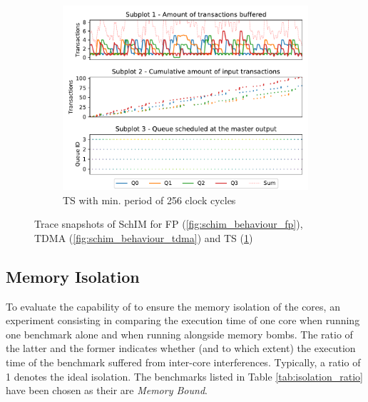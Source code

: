 \begin{figure}[]
\begin{subfigure}{0.5\textwidth}
      \end{subfigure}
      \vfill
      \begin{subfigure}{0.5\textwidth}
        \centering
        \includegraphics[scale=0.55]{images/SchIM_MG_buffering.pdf}
        \caption{TS with min. period of 256 clock cycles}
        \label{fig:schim_behaviour_mg}
      \end{subfigure}
      \caption{Trace snapshots of SchIM for FP (\ref{fig:schim_behaviour_fp}), TDMA (\ref{fig:schim_behaviour_tdma}) and TS (\ref{fig:schim_behaviour_mg})}
      \label{fig:schim_behaviour}
    \end{figure}

  \subsection{Memory Isolation}
    To evaluate the capability of \schim to ensure the memory isolation of the cores, an experiment consisting in comparing the execution time of one core when running one benchmark alone and when running alongside memory bombs. The ratio of the latter and the former indicates whether (and to which extent) the execution time of the benchmark suffered from inter-core interferences. Typically, a ratio of 1 denotes the ideal isolation. The benchmarks listed in Table \ref{tab:isolation_ratio} have been chosen as their are \emph{Memory Bound}.
    
